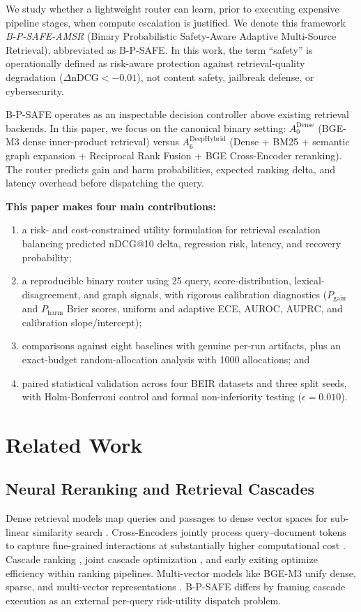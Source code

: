 \documentclass[10pt,journal]{IEEEtran}
\makeatletter
\newcommand{\bpsafe}{B-P-SAFE}
\newcommand{\ndcg}{nDCG@10}
\makeatother
\begin{document}
We study whether a lightweight router can learn, prior to executing expensive pipeline stages, when compute escalation is justified. We denote this framework \emph{B-P-SAFE-AMSR} (Binary Probabilistic Safety-Aware Adaptive Multi-Source Retrieval), abbreviated as \bpsafe{}. In this work, the term ``safety'' is operationally defined as risk-aware protection against retrieval-quality degradation ($\Delta\text{nDCG} < -0.01$), not content safety, jailbreak defense, or cybersecurity.

\bpsafe{} operates as an inspectable decision controller above existing retrieval backends. In this paper, we focus on the canonical binary setting: $A_0^{\mathrm{Dense}}$ (BGE-M3 dense inner-product retrieval) versus $A_6^{\mathrm{DeepHybrid}}$ (Dense + BM25 + semantic graph expansion + Reciprocal Rank Fusion + BGE Cross-Encoder reranking). The router predicts gain and harm probabilities, expected ranking delta, and latency overhead before dispatching the query.

\textbf{This paper makes four main contributions:}
\begin{enumerate}
    \item a risk- and cost-constrained utility formulation for retrieval escalation balancing predicted \ndcg{} delta, regression risk, latency, and recovery probability;
    \item a reproducible binary router using 25 query, score-distribution, lexical-disagreement, and graph signals, with rigorous calibration diagnostics ($P_{\mathrm{gain}}$ and $P_{\mathrm{harm}}$ Brier scores, uniform and adaptive ECE, AUROC, AUPRC, and calibration slope/intercept);
    \item comparisons against eight baselines with genuine per-run artifacts, plus an exact-budget random-allocation analysis with 1000 allocations; and
    \item paired statistical validation across four BEIR datasets and three split seeds, with Holm-Bonferroni control and formal non-inferiority testing ($\epsilon=0.010$).
\end{enumerate}

\section{Related Work}
\label{sec:related}

\subsection{Neural Reranking and Retrieval Cascades}
Dense retrieval models map queries and passages to dense vector spaces for sub-linear similarity search \cite{karpukhin2020dense}. Cross-Encoders jointly process query--document tokens to capture fine-grained interactions at substantially higher computational cost \cite{nogueira2019passage}. Cascade ranking \cite{liu2017cascade}, joint cascade optimization \cite{gallagher2019joint}, and early exiting \cite{busolin2021early} optimize efficiency within ranking pipelines. Multi-vector models like BGE-M3 unify dense, sparse, and multi-vector representations \cite{chen2024bgem3}. \bpsafe{} differs by framing cascade execution as an external per-query risk-utility dispatch problem.
\end{document}
